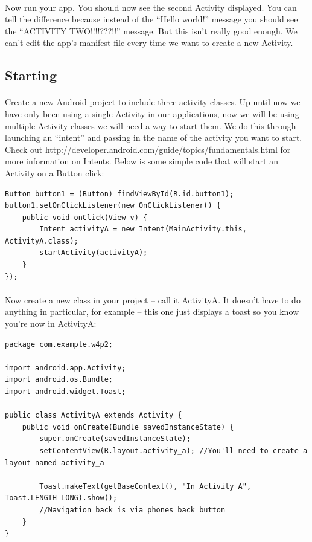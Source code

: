 \documentclass[12pt, a4paper, twoside]{book}
\begin{document}
\paragraph{} Now run your app. You should now see the second Activity displayed. You can tell the difference because instead of the ``Hello world!'' message you should see the ``ACTIVITY TWO!!!!???!!'' message. But this isn't really good enough. We can't edit the app's manifest file every time we want to create a new Activity.

\subsection{Starting}
\paragraph{} Create a new Android project to include three activity classes. Up until now we have only been using a single Activity in our applications, now we will be using multiple Activity classes we will need a way to start them. We do this through launching an “intent” and passing in the name of the activity you want to start. Check out http://developer.android.com/guide/topics/fundamentals.html for more information on Intents. Below is some simple code that will start an Activity on a Button click:

\begin{lstlisting}
Button button1 = (Button) findViewById(R.id.button1);
button1.setOnClickListener(new OnClickListener() {
	public void onClick(View v) {
		Intent activityA = new Intent(MainActivity.this, ActivityA.class);
		startActivity(activityA);
	}
});
\end{lstlisting}

\paragraph{} Now create a new class in your project – call it ActivityA. It doesn’t have to do anything in particular, for example – this one just displays a toast so you know you’re now in ActivityA:

\begin{lstlisting}
package com.example.w4p2;

import android.app.Activity;
import android.os.Bundle;
import android.widget.Toast;

public class ActivityA extends Activity {
	public void onCreate(Bundle savedInstanceState) {
		super.onCreate(savedInstanceState);
		setContentView(R.layout.activity_a); //You'll need to create a layout named activity_a
		
		Toast.makeText(getBaseContext(), "In Activity A", Toast.LENGTH_LONG).show();
		//Navigation back is via phones back button
	}
}
\end{lstlisting}
\end{document}
